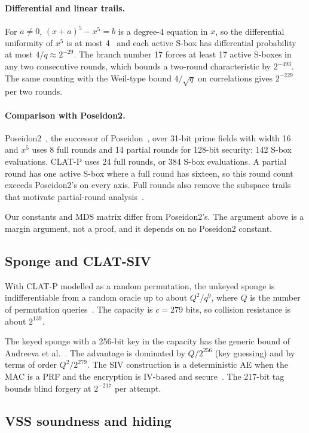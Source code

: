\documentclass[10pt,a4paper]{article}
\theoremstyle{definition}
\theoremstyle{remark}
\begin{document}
\paragraph{Differential and linear trails.}
For $a \neq 0$, $(x+a)^5 - x^5 = b$ is a degree-4 equation in $x$, so the differential uniformity of $x^5$ is at most 4~\cite{nyberg} and each active S-box has differential probability at most $4/q \approx 2^{-29}$. The branch number 17 forces at least 17 active S-boxes in any two consecutive rounds, which bounds a two-round characteristic by $2^{-493}$. The same counting with the Weil-type bound $4/\sqrt{q}$ on correlations gives $2^{-229}$ per two rounds.

\paragraph{Comparison with Poseidon2.}
Poseidon2~\cite{poseidon2,plonky3}, the successor of Poseidon~\cite{poseidon}, over 31-bit prime fields with width 16 and $x^5$ uses 8 full rounds and 14 partial rounds for 128-bit security: 142 S-box evaluations. CLAT-P uses 24 full rounds, or 384 S-box evaluations. A partial round has one active S-box where a full round has sixteen, so this round count exceeds Poseidon2's on every axis. Full rounds also remove the subspace trails that motivate partial-round analysis~\cite{hades}.

Our constants and MDS matrix differ from Poseidon2's. The argument above is a margin argument, not a proof, and it depends on no Poseidon2 constant.

\subsection{Sponge and CLAT-SIV}\label{sec:sivsec}
With CLAT-P modelled as a random permutation, the unkeyed sponge is indifferentiable from a random oracle up to about $Q^2/q^{9}$, where $Q$ is the number of permutation queries~\cite{sponge}. The capacity is $c = 279$ bits, so collision resistance is about $2^{139}$.

The keyed sponge with a 256-bit key in the capacity has the generic bound of Andreeva et al.~\cite{keyedsponge}. The advantage is dominated by $Q/2^{256}$ (key guessing) and by terms of order $Q^2/2^{279}$. The SIV construction is a deterministic AE when the MAC is a PRF and the encryption is IV-based and secure~\cite{siv}. The 217-bit tag bounds blind forgery at $2^{-217}$ per attempt.

\subsection{VSS soundness and hiding}\label{sec:vss}
\end{document}
